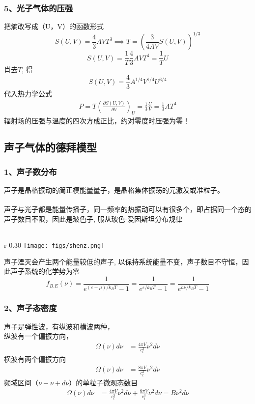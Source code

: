 \begin{frame}
  \frametitle{ 5、光子气体的压强}
  把熵改写成（U，V）的函数形式
  \[ S(U,V) = \frac{4}{3} AV T^3 \implies T = \left(\frac{3}{4AV}  S(U,V)\right)^{1/3} \]
  \[ S(U,V) = \frac{1}{T} \frac{4}{3} AV T^4  =  \frac{1}{T} U \]
  肖去$T$, 得
  \[ S(U,V) = \frac{4}{3} A^{1/4}V^{1/4} U ^{3/4}\]
  代入热力学公式
  \[ \begin{aligned}
    P = T \left( \frac{\partial S(U,V)}{\partial V} \right)_U =  \frac{1}{3} \frac{U}{V} = \frac{1}{3} AT^4
  \end{aligned} \]
  辐射场的压强与温度的四次方成正比，约对零度时压强为零！
\end{frame} 

\subsection{声子气体的德拜模型}
\begin{frame}[label=current]
  \frametitle{ 1、声子数分布}
  {声子是晶格振动的简正模能量量子}，是晶格集体振荡的元激发或准粒子。\\
  ~~\\ 
  声子与光子都是能量传播子，同一频率的热振动可以有很多个，即占据同一个态的声子数目不限，因此是玻色子, 服从玻色-爱因斯坦分布规律 \\
  ~~\\
  \begin{wrapfigure} {r} {0.30\textwidth} %
    \texttt{[image: figs/shenz.png]}   
\end{wrapfigure}
  {声子湮灭会产生两个能量较低的声子}, 以保持系统能量不变，声子数目不守恒，因此声子系统的化学势为零\\
  \[f_{B.E}(\nu) = \frac{1}{e^{(\varepsilon - \mu)/k_B T}-1} = \frac{1}{e^{\varepsilon /k_B T}-1} = \frac{1}{e^{h \nu /k_B T}-1}\]
\end{frame} 

\begin{frame}[label=current]
  \frametitle{ 2、声子态密度}
  声子是弹性波，有纵波和横波两种，\\
  纵波有一个偏振方向，
  \[ \begin{aligned}
    \Omega (\nu) d \nu 
    &= \frac{4\pi V}{c_l^3} \nu^2  d \nu
  \end{aligned}
   \]
  横波有两个偏振方向 \\
  \[ 
    \begin{aligned}
      \Omega (\nu) d \nu 
      &= \frac{8\pi V}{c_t^3} \nu^2  d \nu
    \end{aligned}
     \]
  频域区间（$\nu - \nu + d \nu$）的单粒子微观态数目
  \[ 
\begin{aligned}
  \Omega (\nu) d \nu 
  &= \frac{4\pi V}{c_l^3} \nu^2  d \nu + \frac{8\pi V}{c_t^3} \nu^2  d \nu = B \nu^2  d \nu
\end{aligned}
 \]
\end{frame} 

